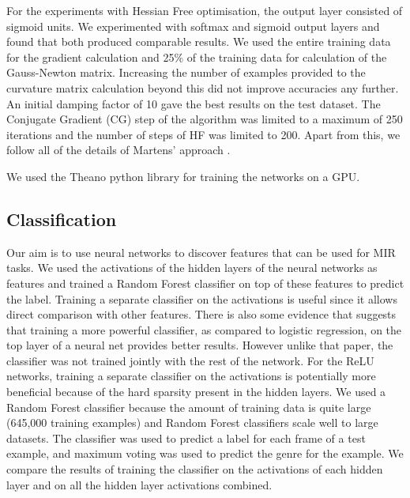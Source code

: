 \documentclass{article}
\begin{document}
For the experiments with Hessian Free optimisation, the output layer consisted of sigmoid units. We experimented with softmax and sigmoid output layers and found that both produced comparable results. We used the entire training data for the gradient calculation and 25\% of the training data for calculation of the Gauss-Newton matrix. Increasing the number of examples provided to the curvature matrix calculation beyond this did not improve accuracies any further. An initial damping factor of 10 gave the best results on the test dataset. The Conjugate Gradient (CG) step of the algorithm was limited to a maximum of 250 iterations and the number of steps of HF was limited to 200. Apart from this, we follow all of the details of Martens' approach \cite{martens2011learning}.  

We used the Theano \cite{bergstra+al:2010-scipy} python library for training the networks on a GPU. %

\vspace{-0.5em}
\subsection{Classification}
Our aim is to use neural networks to discover features that can be used for MIR tasks. We used the activations of the hidden layers of the neural networks as features and trained a Random Forest classifier on top of these features to predict the label. Training a separate classifier on the activations is useful since it allows direct comparison with other features. There is also some evidence \cite{tangdeep} that suggests that training a more powerful classifier, as compared to logistic regression, on the top layer of a neural net provides better results. However unlike that paper, the classifier was not trained jointly with the rest of the network. For the ReLU networks, training a separate classifier on the activations is potentially more beneficial because of the hard sparsity present in the hidden layers. We used a Random Forest classifier because the amount of training data is quite large (645,000 training examples) and Random Forest classifiers scale well to large datasets. The classifier was used to predict a label for each frame of a test example, and maximum voting was used to predict the genre for the example. We compare the results of training the classifier on the activations of each hidden layer and on all the hidden layer activations combined.
\end{document}
